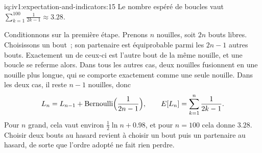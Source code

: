 \begin{solution}{iq:iv1:expectation-and-indicators:15}
Le nombre espéré de boucles vaut $\sum_{k=1}^{100} \frac{1}{2k-1} \approx 3.28$.

Conditionnons sur la première étape. Prenons $n$ nouilles, soit $2n$ bouts libres. Choisissons un bout~; son partenaire est équiprobable parmi les
$2n - 1$ autres bouts. Exactement un de ceux-ci est l'autre bout de la même nouille, et une boucle se referme alors. Dans tous les autres cas, deux nouilles fusionnent en
une nouille plus longue, qui se comporte exactement comme une seule nouille. Dans les deux cas, il reste $n - 1$ nouilles, donc
\[
L_n = L_{n-1} + \text{Bernoulli}\Bigl(\frac{1}{2n-1}\Bigr), \qquad E[L_n] = \sum_{k=1}^{n} \frac{1}{2k-1}.
\]
Pour $n$ grand, cela vaut environ $\tfrac12 \ln n + 0.98$, et pour $n = 100$ cela donne $3.28$. Choisir deux bouts au hasard revient à choisir un bout
puis un partenaire au hasard, de sorte que l'ordre adopté ne fait rien perdre.

\end{solution}

